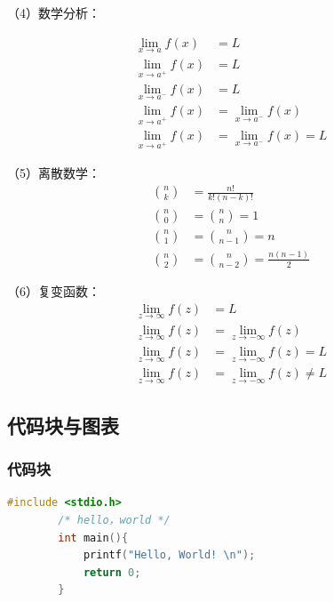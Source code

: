 \begin{ujnbody}
    （4）数学分析：

    \begin{equation}
        \begin{split}
            \lim_{x \to a}f(x) &= L \\
            \lim_{x \to a^+}f(x) &= L \\
            \lim_{x \to a^-}f(x) &= L \\
            \lim_{x \to a^+}f(x) &= \lim_{x \to a^-}f(x) \\
            \lim_{x \to a^+}f(x) &= \lim_{x \to a^-}f(x) = L
        \end{split}
    \end{equation}

    （5）离散数学：
    \begin{equation}
        \begin{split}
            \binom{n}{k} &= \frac{n!}{k!(n-k)!} \\
            \binom{n}{0} &= \binom{n}{n} = 1 \\
            \binom{n}{1} &= \binom{n}{n-1} = n \\
            \binom{n}{2} &= \binom{n}{n-2} = \frac{n(n-1)}{2}
        \end{split}
    \end{equation}

    （6）复变函数：
    \begin{equation}
        \begin{split}
            \lim_{z \to \infty}f(z) &= L \\
            \lim_{z \to \infty}f(z) &= \lim_{z \to -\infty}f(z) \\
            \lim_{z \to \infty}f(z) &= \lim_{z \to -\infty}f(z) = L \\
            \lim_{z \to \infty}f(z) &= \lim_{z \to -\infty}f(z) \neq L
        \end{split}
    \end{equation}
    \subsection{代码块与图表}
    \subsubsection{代码块}
    \begin{lstlisting}[language=C]
        #include <stdio.h>
        /* hello，world */
        int main(){
            printf("Hello, World! \n"); 
            return 0;
        }
    \end{lstlisting}

\end{ujnbody}

